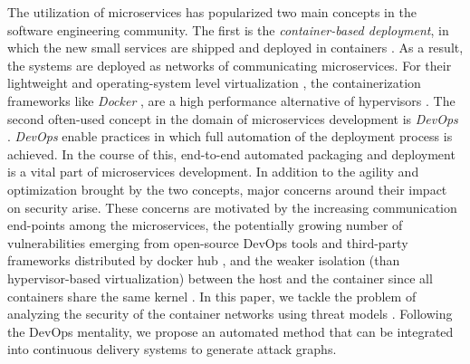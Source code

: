 The utilization of microservices has popularized two main concepts in the software engineering community. The first is the \textit{container-based deployment}, in which the new small services are shipped and deployed in containers \cite{jaramillo2016leveraging}. As a result, the systems are deployed as networks of communicating microservices. For their lightweight and operating-system level virtualization \cite{bottomely}, the containerization frameworks like \textit{Docker} \cite{cerny2018contextual}, are a high performance alternative of hypervisors \cite{kratzke2017microservices}. The second often-used concept in the domain of microservices development is \textit{DevOps} \cite{cerny2018contextual}. \textit{DevOps} enable practices in which full automation of the deployment process is achieved. In the course of this, end-to-end automated packaging and deployment is a vital part of microservices development. In addition to the agility and optimization brought by the two concepts, major concerns around their impact on security \cite{ahmadvand2016requirements} arise. These concerns are motivated by the increasing communication end-points among the microservices, the potentially growing number of vulnerabilities emerging from open-source DevOps tools and third-party frameworks distributed by docker hub \cite{shu2017study,gummaraju2015over}, and the weaker isolation (than hypervisor-based virtualization) between the host and the container since all containers share the same kernel \cite{Bottomley,bui2015analysis}. In this paper, we tackle the problem of analyzing the security of the container networks using threat models \cite{kordy2014dag}. Following the DevOps mentality, we propose an automated method that can be integrated into continuous delivery systems to generate attack graphs.



